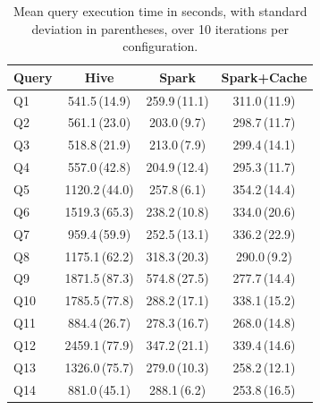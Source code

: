 \begin{table}[htbp]
  \centering
  \caption{Mean query execution time in seconds, with standard deviation in
           parentheses, over 10 iterations per configuration.}
  \label{tab:benchmark-results}
  \renewcommand{\arraystretch}{1.15}
  \small
  \begin{tabular}{@{} l c c c @{}}
    \hline
    \textbf{Query} & \textbf{Hive} & \textbf{Spark} & \textbf{Spark+Cache} \\
    \hline
    Q1  &  541.5\,(14.9) & 259.9\,(11.1) & 311.0\,(11.9) \\
    Q2  &  561.1\,(23.0) & 203.0\,\phantom{0}(9.7) & 298.7\,(11.7) \\
    Q3  &  518.8\,(21.9) & 213.0\,\phantom{0}(7.9) & 299.4\,(14.1) \\
    Q4  &  557.0\,(42.8) & 204.9\,(12.4) & 295.3\,(11.7) \\
    Q5  & 1120.2\,(44.0) & 257.8\,\phantom{0}(6.1) & 354.2\,(14.4) \\
    Q6  & 1519.3\,(65.3) & 238.2\,(10.8) & 334.0\,(20.6) \\
    Q7  &  959.4\,(59.9) & 252.5\,(13.1) & 336.2\,(22.9) \\
    Q8  & 1175.1\,(62.2) & 318.3\,(20.3) & 290.0\,\phantom{0}(9.2) \\
    Q9  & 1871.5\,(87.3) & 574.8\,(27.5) & 277.7\,(14.4) \\
    Q10 & 1785.5\,(77.8) & 288.2\,(17.1) & 338.1\,(15.2) \\
    Q11 &  884.4\,(26.7) & 278.3\,(16.7) & 268.0\,(14.8) \\
    Q12 & 2459.1\,(77.9) & 347.2\,(21.1) & 339.4\,(14.6) \\
    Q13 & 1326.0\,(75.7) & 279.0\,(10.3) & 258.2\,(12.1) \\
    Q14 &  881.0\,(45.1) & 288.1\,\phantom{0}(6.2) & 253.8\,(16.5) \\
    \hline
  \end{tabular}
\end{table}

